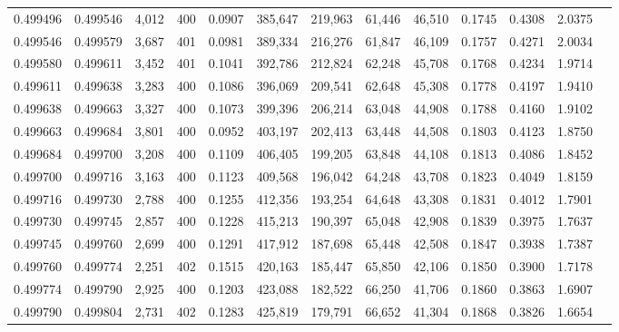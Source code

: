 \begin{tabular}{rrrrrrrrrrrrr}
0.499496 & 0.499546 & 4,012 & 400 &                                     0.0907 & 385,647 & 219,963 &  61,446 &  46,510 & 0.1745 & 0.4308 & 2.0375 \\
0.499546 & 0.499579 & 3,687 & 401 &                                     0.0981 & 389,334 & 216,276 &  61,847 &  46,109 & 0.1757 & 0.4271 & 2.0034 \\
0.499580 & 0.499611 & 3,452 & 401 &                                     0.1041 & 392,786 & 212,824 &  62,248 &  45,708 & 0.1768 & 0.4234 & 1.9714 \\
0.499611 & 0.499638 & 3,283 & 400 &                                     0.1086 & 396,069 & 209,541 &  62,648 &  45,308 & 0.1778 & 0.4197 & 1.9410 \\
0.499638 & 0.499663 & 3,327 & 400 &                                     0.1073 & 399,396 & 206,214 &  63,048 &  44,908 & 0.1788 & 0.4160 & 1.9102 \\
0.499663 & 0.499684 & 3,801 & 400 &                                     0.0952 & 403,197 & 202,413 &  63,448 &  44,508 & 0.1803 & 0.4123 & 1.8750 \\
0.499684 & 0.499700 & 3,208 & 400 &                                     0.1109 & 406,405 & 199,205 &  63,848 &  44,108 & 0.1813 & 0.4086 & 1.8452 \\
0.499700 & 0.499716 & 3,163 & 400 &                                     0.1123 & 409,568 & 196,042 &  64,248 &  43,708 & 0.1823 & 0.4049 & 1.8159 \\
0.499716 & 0.499730 & 2,788 & 400 &                                     0.1255 & 412,356 & 193,254 &  64,648 &  43,308 & 0.1831 & 0.4012 & 1.7901 \\
0.499730 & 0.499745 & 2,857 & 400 &                                     0.1228 & 415,213 & 190,397 &  65,048 &  42,908 & 0.1839 & 0.3975 & 1.7637 \\
0.499745 & 0.499760 & 2,699 & 400 &                                     0.1291 & 417,912 & 187,698 &  65,448 &  42,508 & 0.1847 & 0.3938 & 1.7387 \\
0.499760 & 0.499774 & 2,251 & 402 &                                     0.1515 & 420,163 & 185,447 &  65,850 &  42,106 & 0.1850 & 0.3900 & 1.7178 \\
0.499774 & 0.499790 & 2,925 & 400 &                                     0.1203 & 423,088 & 182,522 &  66,250 &  41,706 & 0.1860 & 0.3863 & 1.6907 \\
0.499790 & 0.499804 & 2,731 & 402 &                                     0.1283 & 425,819 & 179,791 &  66,652 &  41,304 & 0.1868 & 0.3826 & 1.6654 \\

\end{tabular}
